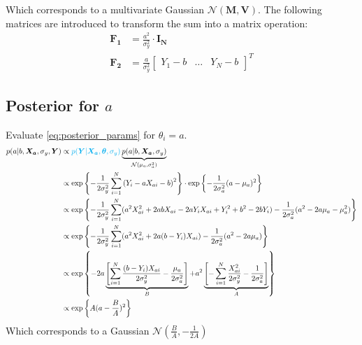 \documentclass[10pt]{article}
\renewcommand{\vec}[1]{\boldsymbol{#1}}
\newcommand{\mat}[1]{\boldsymbol{#1}}
\begin{document}
Which corresponds to a multivariate Gaussian $\mathcal{N}(\vec{M}, \mat{V})$. 
The following matrices are introduced to transform the sum into a matrix operation:
\begin{align}
    \mat{F_1} &= \frac{a^2}{\sigma_y^2} \cdot \mat{I_N} \\
    \vec{F_2} &= \frac{a}{\sigma_y^2} \begin{bmatrix} Y_1 - b & \dots & Y_N -b \end{bmatrix}^T
\end{align}

\subsection{Posterior for $a$}
Evaluate \cref{eq:posterior_params} for $\theta_i= a$.
\begin{align}
    p(a|b, \vec{X_a}, \sigma_y, \vec{Y}) &\propto {\color{cyan} p(\vec{Y} | \vec{X_a}, \vec{\theta}, \sigma_y)} \underbrace{p(a | b, \vec{X_a}, \sigma_{y})}_{\mathcal{N}(\mu_a, \sigma_a^2)} \\
    &\propto \exp\left\{ - \frac{1}{2\sigma_y^2} \sum_{i=1}^N \left( Y_i - a X_{ai} - b \right)^2 \right\} \cdot \exp\left\{ - \frac{1}{2\sigma_a^2} ( a - \mu_a )^2 \right\} \\
    &\propto \exp\left\{ - \frac{1}{2\sigma_y^2} \sum_{i=1}^N (a^2 X_{ai}^2  + 2 a b X_{ai} - 2 a Y_i X_{ai} + Y_i^2 + b^2 -2 b Y_i) - \frac{1}{2\sigma_a^2} ( a^2 - 2 a \mu_a - \mu_a^2 ) \right\} \\
    &\propto \exp\left\{ - \frac{1}{2\sigma_y^2} \sum_{i=1}^N (a^2 X_{ai}^2  + 2 a (b - Y_i) X_{ai} ) - \frac{1}{2\sigma_a^2} ( a^2 - 2 a \mu_a ) \right\} \\
    &\propto \exp\left\{ - 2 a \underbrace{\left[ \sum_{i=1}^N \frac{(b - Y_i) X_{ai}}{2\sigma_y^2} - \frac{\mu_a}{2\sigma_a^2} \right]}_{B} + a^2 \underbrace{\left[ - \sum_{i=1}^N \frac{X_{ai}^2}{2\sigma_y^2}  - \frac{1}{2\sigma_a^2} \right]}_{A} \right\} \\
    &\propto \exp\left\{ A (a - \frac{B}{A})^2\right\}
\end{align}
Which corresponds to a Gaussian $\mathcal{N}(\frac{B}{A}, -\frac{1}{2A})$
\end{document}

